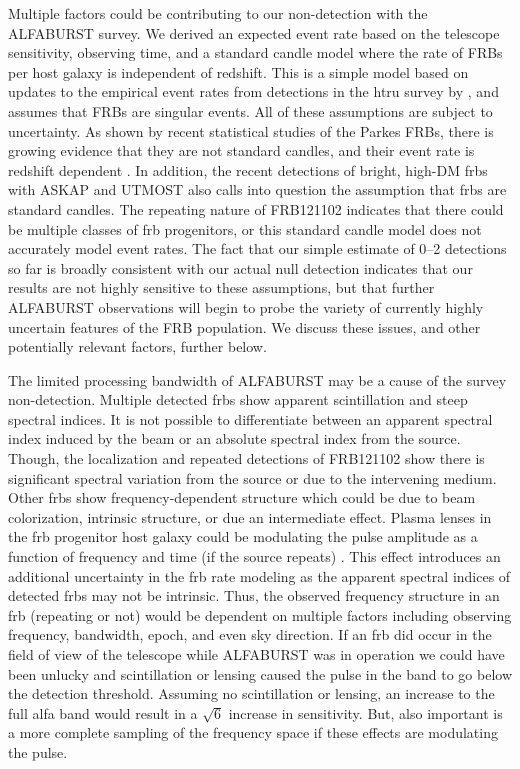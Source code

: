 \documentclass[a4paper,fleqn,usenatbib]{mnras}
\begin{document}
Multiple factors could be contributing to our non-detection with the ALFABURST
survey. We derived an expected event rate based on the telescope sensitivity,
observing time, and a standard candle model \citep{2013MNRAS.436L...5L} where
the rate of FRBs per host galaxy is independent of redshift. This is a simple
model based on updates to the empirical event rates from detections in the
\gls{htru} survey \citep{2013Sci...341...53T} by \cite{2016MNRAS.460.3370C}, and
assumes that FRBs are singular events. All of these assumptions are subject to
uncertainty. As shown by recent statistical studies of the Parkes FRBs, there is
growing evidence that they are not  standard candles, and their event rate is
redshift dependent \citep{2016MNRAS.458..708C,ranethesis}.  In addition, the
recent detections of bright, high-DM \glspl{frb} with ASKAP
\citep{2017ApJ...841L..12B} and UTMOST \citep{2017MNRAS.468.3746C,atel10697}
also calls into question the assumption that \glspl{frb} are  standard candles.
The repeating nature of FRB121102 \citep{2016Natur.531..202S} indicates that
there could be multiple classes of \gls{frb} progenitors, or this standard
candle model does not accurately model event rates. The fact that our simple
estimate of 0--2 detections so far is broadly consistent with our actual null
detection indicates that our results are not highly sensitive to these
assumptions, but that further ALFABURST observations will begin to probe the
variety of currently highly uncertain features of the FRB population. We discuss
these issues, and other potentially relevant factors, further below.

The limited processing bandwidth of ALFABURST may be a cause of the survey
non-detection. Multiple detected \glspl{frb} show apparent scintillation and
steep spectral indices. It is not possible to differentiate between an apparent
spectral index induced by the beam or an absolute spectral index from the
source. Though, the localization and repeated detections of FRB121102 show there
is significant spectral variation from the source or due to the intervening
medium. Other \glspl{frb} show frequency-dependent structure which could be due
to beam colorization, intrinsic structure, or due an intermediate effect. Plasma
lenses in the \gls{frb} progenitor host galaxy could be modulating the pulse
amplitude as a function of frequency and time (if the source repeats)
\citep{2017ApJ...842...35C}. This effect introduces an additional uncertainty in
the \gls{frb} rate modeling as the apparent spectral indices of detected
\glspl{frb} may not be intrinsic. Thus, the observed frequency structure in an
\gls{frb} (repeating or not) would be dependent on multiple factors including
observing frequency, bandwidth, epoch, and even sky direction. If an \gls{frb}
did occur in the field of view of the telescope while ALFABURST was in operation
we could have been unlucky and scintillation or lensing caused the pulse in the
band to go below the detection threshold. Assuming no scintillation or lensing,
an increase to the full \gls{alfa} band would result in a $\sqrt{6}$ increase in
sensitivity. But, also important is a more complete sampling of the frequency
space if these effects are modulating the pulse.
\end{document}
